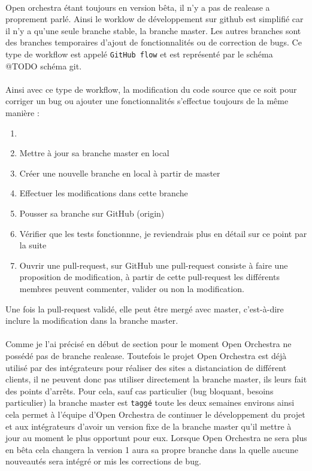 \paragraph{}
Open orchestra étant toujours en version bêta, il n'y a pas de realease a proprement parlé. Ainsi le worklow de développement sur github est simplifié car il n'y a qu'une seule branche stable, la branche master. Les autres branches sont des branches temporaires d'ajout de fonctionnalités ou de correction de bugs. Ce type de workflow est appelé \verb?GitHub flow? et est représenté par le schéma @TODO schéma git.
\paragraph{}
Ainsi avec ce type de workflow, la modification du code source que ce soit pour corriger un bug ou ajouter une fonctionnalités s'effectue toujours de la même manière : 
\begin{enumerate}
\item[]
\item Mettre à jour sa branche master en local
\item Créer une nouvelle branche en local à partir de master
\item Effectuer les modifications dans cette branche
\item Pousser sa branche sur GitHub (origin)
\item Vérifier que les tests fonctionnne, je reviendrais plus en détail sur ce point par la suite
\item Ouvrir une pull-request, sur GitHub une pull-request consiste à faire une proposition de modification, à partir de cette pull-request les différents membres peuvent commenter, valider ou non la modification.
\end{enumerate}

Une fois la pull-request validé, elle peut être mergé avec master, c'est-à-dire inclure la modification dans la branche master.
\paragraph{}
Comme je l'ai précisé en début de section pour le moment Open Orchestra ne possédé pas de branche realease. Toutefois le projet Open Orchestra est déjà utilisé par des intégrateurs pour réaliser des sites a distanciation de différent clients, il ne peuvent donc pas utiliser directement la branche master, ils leurs fait des points d'arrêts. Pour cela, sauf cas particulier (bug bloquant, besoins particulier) la branche master est \verb?taggé? toute les deux semaines environs ainsi cela permet à l'équipe d'Open Orchestra de continuer le développement  du projet et aux intégrateurs d'avoir un version fixe de la branche master qu'il mettre à jour au moment le plus opportunt pour eux.  Lorsque Open Orchestra ne sera plus en bêta cela changera la version 1 aura sa propre branche dans la quelle aucune nouveautés sera intégré or mis les corrections de bug.

